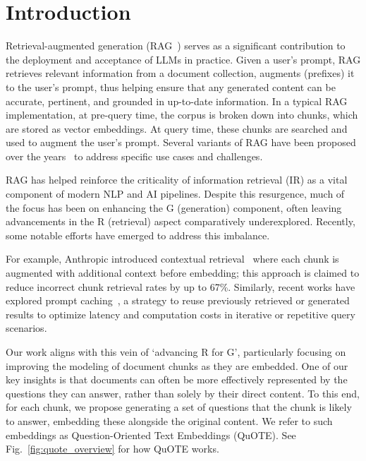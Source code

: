 \section{Introduction}

Retrieval-augmented generation (RAG~\cite{rag1,rag2,rag3})
serves as a significant contribution to the deployment and acceptance of LLMs in practice.
Given a user's prompt, RAG retrieves relevant information from a document collection, augments (prefixes) it to the user's prompt, thus helping ensure that any generated content can be accurate, pertinent, and grounded in up-to-date information.
In a typical RAG implementation, at pre-query time, the corpus is broken down into chunks, which are stored as vector embeddings. At query time,  these chunks are searched and used to augment the user's prompt.
Several variants of RAG have been proposed over the years~\cite{rag-variant1, rag-variant2, rag-variant3} to address specific use cases and challenges. 

RAG has helped reinforce the criticality of information retrieval (IR) as a vital component of modern NLP and AI pipelines. Despite this resurgence, much of the focus has been on enhancing the G (generation) component, often leaving advancements in the R (retrieval) aspect comparatively underexplored. Recently, some notable efforts have emerged to address this imbalance.

For example, Anthropic introduced contextual retrieval~\cite{anthropic_contextual_retrieval}
where each
chunk is augmented with additional context before embedding; this approach is claimed to reduce incorrect chunk retrieval rates by up to 67\%.
Similarly, recent works have explored prompt caching~\cite{prompt-caching-RAG}, a strategy to reuse previously retrieved or generated results to optimize latency and computation costs in iterative or repetitive query scenarios.

Our work aligns with this vein of `advancing R for G', particularly focusing on improving the modeling of document chunks as they are embedded. One of our key insights is that documents can often be more effectively represented by the questions they can answer, rather than solely by their direct content. To this end, for each chunk, we propose generating a set of questions that the chunk is likely to answer, embedding these alongside the original content. We refer to such embeddings as Question-Oriented  Text Embeddings (QuOTE). See Fig.~\ref{fig:quote_overview} for how QuOTE works.


